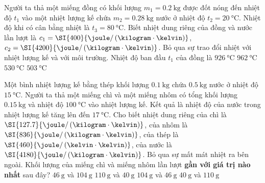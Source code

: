 \begin{ex}
	Người ta thả một miếng đồng có khối lượng $m_1=\SI{0.2}{\kilogram}$ được đốt nóng đến nhiệt độ $t_1$ vào một nhiệt lượng kế chứa $m_2=\SI{0.28}{\kilogram}$ nước ở nhiệt độ $t_2=\SI{20}{\celsius}$. Nhiệt độ khi có cân bằng nhiệt là $t_3=\SI{80}{\celsius}$. Biết nhiệt dung riêng của đồng và nước lần lượt là $c_1=\SI{400}{\joule/\left(\kilogram\cdot\kelvin\right)}$, $c_2=\SI{4200}{\joule/\left(\kilogram\cdot\kelvin\right)}$. Bỏ qua sự trao đổi nhiệt với nhiệt lượng kế và với môi trường. Nhiệt độ ban đầu $t_1$ của đồng là
	\choice
	{$\SI{926}{\celsius}$}
	{\True $\SI{962}{\celsius}$}
	{$\SI{530}{\celsius}$}
	{$\SI{503}{\celsius}$}
\end{ex}
\begin{ex}
	Một bình nhiệt lượng kế bằng thép khối lượng $\SI{0.1}{\kilogram}$ chứa $\SI{0.5}{\kilogram}$ nước ở nhiệt độ $\SI{15}{\celsius}$. Người ta thả một miếng chì và một miếng nhôm có tổng khối lượng $\SI{0.15}{\kilogram}$ và nhiệt độ $\SI{100}{\celsius}$ vào nhiệt lượng kế. Kết quả là nhiệt độ của nước trong nhiệt lượng kế tăng lên đến $\SI{17}{\celsius}$. Cho biết nhiệt dung riêng của chì là $\SI{127.7}{\joule/\left(
		\kilogram\cdot\kelvin\right)}$, của nhôm là $\SI{836}{\joule/\left(\kilogram\cdot\kelvin\right)}$, của thép là $\SI{460}{\joule/\left(\kelvin\cdot\kelvin\right)}$, của nước là $\SI{4180}{\joule/\left(\kilogram\cdot\kelvin\right)}$. Bỏ qua sự mất mát nhiệt ra bên ngoài. Khối lượng của miếng chì và miếng nhôm lần lượt \textbf{gần với giá trị nào nhất} sau đây?
	\choice
	{$\SI{46}{\gram}$ và $\SI{104}{\gram}$}
	{$\SI{110}{\gram}$ và $\SI{40}{\gram}$}
	{\True $\SI{104}{\gram}$ và $\SI{46}{\gram}$}
	{$\SI{40}{\gram}$ và $\SI{110}{\gram}$}
\end{ex}

